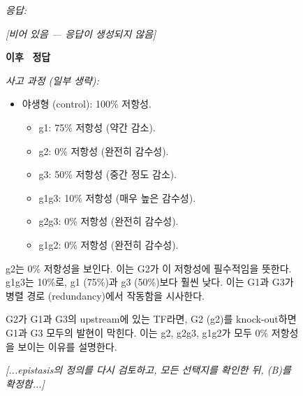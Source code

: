\begin{figure}[t]
\begin{minipage}[t]{0.49\textwidth}
\begin{mdframed}[style=beforebox]
\vspace{2pt}
\noindent\textit{응답:}
\begin{mdframed}[style=thinkbox]
\textit{[비어 있음 --- 응답이 생성되지 않음]}
\end{mdframed}
\end{mdframed}
\end{minipage}%
\hfill
\begin{minipage}[t]{0.49\textwidth}
\begin{mdframed}[style=afterbox]
\noindent\textbf{\sdrlfootnotesize 이후} \hfill {\colorbox{afterbg}{\textcolor{afterframe}{\textbf{\checkmark~정답}}}}

\noindent\textit{사고 과정 (일부 생략):}
\begin{mdframed}[style=thinkbox]
\begin{itemize}[leftmargin=12pt, labelsep=4pt, itemsep=0pt, parsep=0pt, topsep=0pt]
\item 야생형 (control): 100\% 저항성.
  \begin{itemize}[leftmargin=12pt, labelsep=4pt, itemsep=0pt, parsep=0pt, topsep=0pt]
  \item g1: 75\% 저항성 (약간 감소).
  \item g2: 0\% 저항성 (완전히 감수성).
  \item g3: 50\% 저항성 (중간 정도 감소).
  \item g1g3: 10\% 저항성 (매우 높은 감수성).
  \item g2g3: 0\% 저항성 (완전히 감수성).
  \item g1g2: 0\% 저항성 (완전히 감수성).
  \end{itemize}
\end{itemize}
g2는 0\% 저항성을 보인다. 이는 G2가 이 저항성에 필수적임을 뜻한다. g1g3는 10\%로, g1 (75\%)과 g3 (50\%)보다 훨씬 낮다. 이는 G1과 G3가 병렬 경로 (redundancy)에서 작동함을 시사한다.

\noindent G2가 G1과 G3의 upstream에 있는 TF라면, G2 (g2)를 knock-out하면 G1과 G3 모두의 발현이 막힌다. 이는 g2, g2g3, g1g2가 모두 0\% 저항성을 보이는 이유를 설명한다.

\vspace{2pt}
\noindent\textit{[...epistasis의 정의를 다시 검토하고, 모든 선택지를 확인한 뒤, (B)를 확정함...]}
\vspace{2pt}


\end{mdframed}
\end{mdframed}
\end{minipage}
\end{figure}
